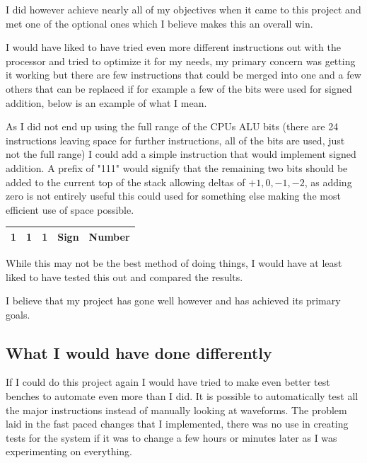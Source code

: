 \documentclass	[a4paper, 10pt]	{article}
\begin{document}
    I did however achieve nearly all of my objectives when it came to this project and
    met one of the optional ones which I believe makes this an overall win.

    I would have liked to have tried even more different instructions out with the processor and
    tried to optimize it for my needs, my primary concern was getting it working but
    there are few instructions that could be merged into one and a few others that can
    be replaced if for example a few of the bits were used for signed addition, below
    is an example of what I mean.

    As I did not end up using the full range of the CPUs ALU bits (there are 24 instructions
    leaving space for further instructions, all of the bits are used, just not the full range)
    I could add a simple instruction that would implement signed addition. A prefix of "111"
    would signify that the remaining two bits should be added to the current top of the stack
    allowing deltas of $+1,0,-1,-2$, as adding zero is not entirely useful this could used for
    something else making the most efficient use of space possible.

    \begin{center}
      \begin{tabular}{l | c | c | c | r }
        \hline
        1 & 1 & 1 & Sign & Number \\
        \hline
      \end{tabular}
    \end{center}

    While this may not be the best method of doing things, I would have at least liked to
    have tested this out and compared the results.

    I believe that my project has gone well however and has achieved its primary goals.

    \subsection{What I would have done differently}

    If I could do this project again I would have tried to make even better test benches
    to automate even more than I did. It is possible to automatically test all
    the major instructions instead of manually looking at waveforms. The problem laid in
    the fast paced changes that I implemented, there was no use in creating tests for the
    system if it was to change a few hours or minutes later as I was experimenting on 
    everything.
\end{document}
